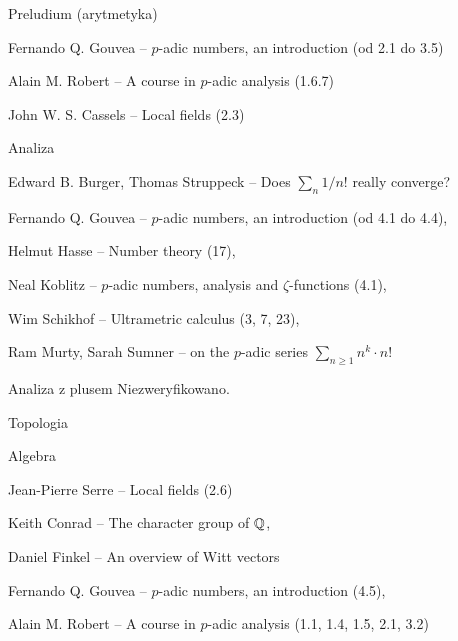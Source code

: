 \begin{enumx}
\item Preludium (arytmetyka)
\begin{enumx}
	\item Fernando Q. Gouvea -- $p$-adic numbers, an introduction (od 2.1 do 3.5)
	\item Alain M. Robert -- A course in $p$-adic analysis (1.6.7)
	\item John W. S. Cassels -- Local fields (2.3)
\end{enumx}
\item{Analiza}
\begin{enumx}
	\item Edward B. Burger, Thomas Struppeck -- Does $\sum_n 1/n!$ really converge? 
	\item Fernando Q. Gouvea -- $p$-adic numbers, an introduction (od 4.1 do 4.4),
	\item Helmut Hasse -- Number theory (17),
	\item Neal Koblitz -- $p$-adic numbers, analysis and $\zeta$-functions (4.1),
	\item Wim Schikhof -- Ultrametric calculus (3, 7, 23), 
	\item Ram Murty, Sarah Sumner -- on the $p$-adic series $\sum_{n \ge 1} n^k \cdot n!$
\end{enumx}
\item{Analiza z plusem}
Niezweryfikowano.
\item{Topologia}
\begin{enumx}
	\item \end{enumx}
\item{Algebra}
\begin{enumx}
	\item Jean-Pierre Serre -- Local fields (2.6)
	\item Keith Conrad -- The character group of $\mathbb Q$, 
	\item Daniel Finkel -- An overview of Witt vectors
	\item Fernando Q. Gouvea -- $p$-adic numbers, an introduction (4.5),
	\item Alain M. Robert -- A course in $p$-adic analysis (1.1, 1.4, 1.5, 2.1, 3.2)

\end{enumx}
\end{enumx}
